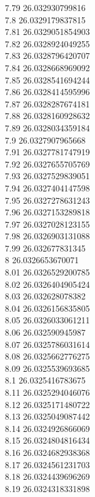 {7.79	26.032930799816\\
7.8	26.0329179837815\\
7.81	26.0329051854903\\
7.82	26.0328924049255\\
7.83	26.0328796420707\\
7.84	26.0328668969092\\
7.85	26.0328541694244\\
7.86	26.0328414595996\\
7.87	26.0328287674181\\
7.88	26.0328160928632\\
7.89	26.0328034359184\\
7.9	26.0327907965668\\
7.91	26.0327781747919\\
7.92	26.0327655705769\\
7.93	26.0327529839051\\
7.94	26.0327404147598\\
7.95	26.0327278631243\\
7.96	26.0327153289818\\
7.97	26.0327028123155\\
7.98	26.0326903131088\\
7.99	26.032677831345\\
8	26.0326653670071\\
8.01	26.0326529200785\\
8.02	26.0326404905424\\
8.03	26.032628078382\\
8.04	26.0326156835805\\
8.05	26.0326033061211\\
8.06	26.032590945987\\
8.07	26.0325786031614\\
8.08	26.0325662776275\\
8.09	26.0325539693685\\
8.1	26.0325416783675\\
8.11	26.0325294046076\\
8.12	26.0325171480722\\
8.13	26.0325049087442\\
8.14	26.0324926866069\\
8.15	26.0324804816434\\
8.16	26.0324682938368\\
8.17	26.0324561231703\\
8.18	26.0324439696269\\
8.19	26.0324318331898\\
}
